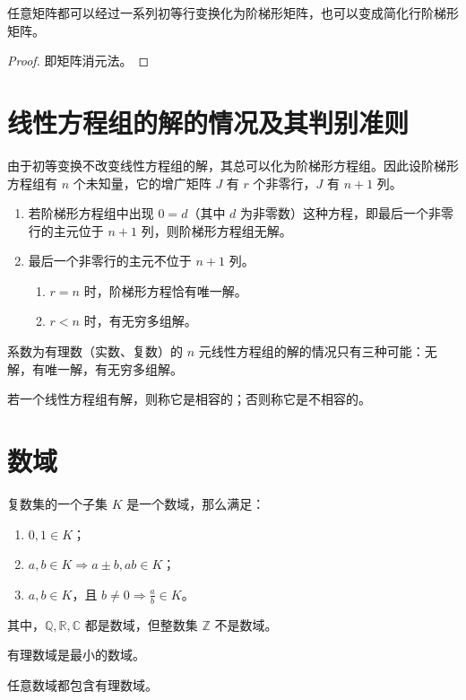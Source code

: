 \begin{theorem}
	任意矩阵都可以经过一系列初等行变换化为阶梯形矩阵，也可以变成简化行阶梯形矩阵。
\end{theorem}

\begin{proof}
	即矩阵消元法。
\end{proof}

\section{线性方程组的解的情况及其判别准则}


由于初等变换不改变线性方程组的解，其总可以化为阶梯形方程组。因此设阶梯形方程组有 $n$ 个未知量，它的增广矩阵 $J$ 有 $r$ 个非零行，$J$ 有 $n+1$ 列。

\begin{enumerate}
	\item 若阶梯形方程组中出现 $0=d$（其中 $d$ 为非零数）这种方程，即最后一个非零行的主元位于 $n+1$ 列，则阶梯形方程组无解。
	\item 最后一个非零行的主元不位于 $n+1$ 列。

	      \begin{enumerate}
		      \item $r=n$ 时，阶梯形方程恰有唯一解。
		      \item $r<n$ 时，有无穷多组解。
	      \end{enumerate}
\end{enumerate}

\begin{theorem}
	系数为有理数（实数、复数）的 $n$ 元线性方程组的解的情况只有三种可能：无解，有唯一解，有无穷多组解。
\end{theorem}

若一个线性方程组有解，则称它是相容的；否则称它是不相容的。

\section{数域}

\begin{definition}
	复数集的一个子集 $K$ 是一个数域，那么满足：

	\begin{enumerate}
		\item $0,1 \in K$；
		\item $a,b \in K \Rightarrow a \pm b,ab \in K$；
		\item $a,b \in K$，且 $b \ne 0 \Rightarrow \frac{a}{b} \in K$。
	\end{enumerate}
\end{definition}

其中，$\mathbb{Q},\mathbb{R},\mathbb{C}$ 都是数域，但整数集 $\mathbb{Z}$ 不是数域。

有理数域是最小的数域。

\begin{theorem}
	任意数域都包含有理数域。
\end{theorem}


